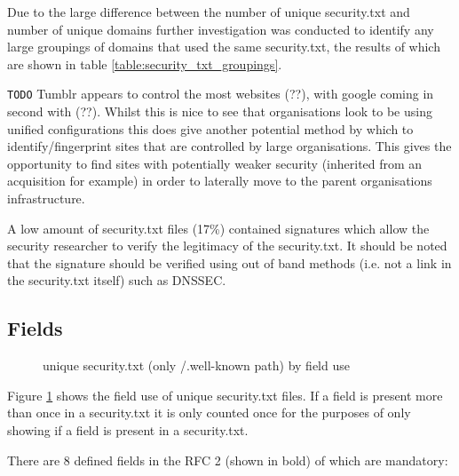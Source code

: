 \documentclass{mscreport}
\begin{document}
\vspace{0.3cm} \noindent
Due to the large difference between the number of unique security.txt and number of unique domains further investigation was conducted to identify any large groupings of domains that used the same security.txt, the results of which are shown in table \ref{table:security_txt_groupings}.

\vspace{0.3cm} \noindent
\texttt{TODO}
Tumblr appears to control the most websites (??), with google coming in second with (??). Whilst this is nice to see that organisations look to be using unified configurations this does give another potential method by which to identify/fingerprint sites that are controlled by large organisations. This gives the opportunity to find sites with potentially weaker security (inherited from an acquisition for example) in order to laterally move to the parent organisations infrastructure.

\clearpage
\newpage 

A low amount of security.txt files (17\%) contained signatures which allow the security researcher to verify the legitimacy of the security.txt. It should be noted that the signature should be verified using out of band methods (i.e. not a link in the security.txt itself) such as DNSSEC.

\subsection{Fields}

\begin{figure}[H]
	\begin{center}
		\caption{unique security.txt (only /.well-known path) by field use}
		\label{fig:security_txt_by_fields}
	\end{center}
\end{figure}

\noindent
Figure \ref{fig:security_txt_by_fields} shows the field use of unique security.txt files. If a field is present more than once in a security.txt it is only counted once for the purposes of only showing if a field is present in a security.txt.

\vspace{0.3cm} \noindent
There are 8 defined fields in the RFC 2 (shown in bold) of which are mandatory:
\end{document}

